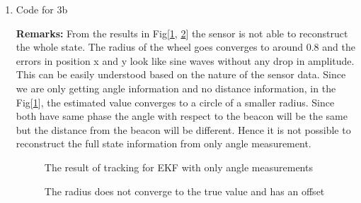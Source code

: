 \begin{enumerate}
\newpage
\item  Code for 3b

\textbf{Remarks:} From the results in Fig[\ref{fig7}, \ref{fig8}] the sensor is not able to reconstruct the whole state. The radius of the wheel goes converges to around 0.8 and the errors in position x and y look like sine waves without any drop in amplitude. This can be easily understood based on the nature of the sensor data. Since we are only getting angle information and no distance information, in the Fig[\ref{fig7}], the estimated value converges to a circle of a smaller radius. Since both have same phase the angle with respect to the beacon will be the same but the distance from the beacon will be different. Hence it is not possible to reconstruct the full state information from only angle measurement.

\begin{figure}[h!]
  \centering
  \def\svgwidth{\columnwidth}
  
   \caption{The result of tracking for EKF with only angle measurements}
   \label{fig7}
\end{figure}
\begin{figure}[h!]
  \centering
  \def\svgwidth{\columnwidth}
  
   \caption{The radius does not converge to the true value and has an offset}
   \label{fig8}
\end{figure}
\end{enumerate} 



